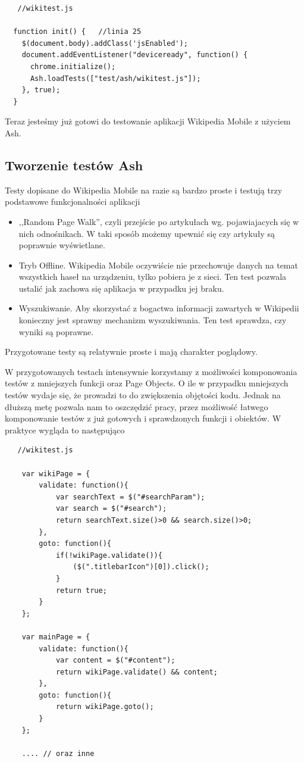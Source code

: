 \documentclass[brudnopis]{xmgr}
\begin{document}
\begin{lstlisting}
   //wikitest.js

  function init() {   //linia 25
    $(document.body).addClass('jsEnabled');
    document.addEventListener("deviceready", function() {
      chrome.initialize(); 
      Ash.loadTests(["test/ash/wikitest.js"]);
    }, true);
  }
\end{lstlisting}

Teraz jesteśmy już gotowi do testowanie aplikacji Wikipedia Mobile z użyciem Ash.

\subsection{Tworzenie testów Ash}

Testy dopisane do Wikipedia Mobile na razie są bardzo proste i testują trzy podstawowe funkcjonalności aplikacji 

\begin{itemize}
  \item ,,Random Page Walk'', czyli przejście po artykułach wg. pojawiajacych się w nich odnośnikach. W taki sposób możemy upewnić się czy artykuły są poprawnie wyświetlane.
  \item Tryb Offline. Wikipedia Mobile oczywiście nie przechowuje danych na temat wszystkich haseł na urządzeniu, tylko pobiera je z sieci. Ten test pozwala ustalić jak zachowa się aplikacja w przypadku jej braku.
  \item Wyszukiwanie. Aby skorzystać z bogactwa informacji zawartych w Wikipedii konieczny jest sprawny mechanizm wyszukiwania. Ten test sprawdza, czy wyniki są poprawne.  
\end{itemize}

Przygotowane testy są relatywnie proste i mają charakter poglądowy. 

W przygotowanych testach intensywnie korzystamy z możliwości komponowania testów z mniejszych funkcji oraz Page Objects. O ile w przypadku mniejszych testów wydaje się, że prowadzi to do zwiększenia objętości kodu. Jednak na dłuższą metę pozwala nam to oszczędzić pracy, przez możliwość łatwego komponowanie testów z już gotowych i sprawdzonych funkcji i obiektów. W praktyce wygląda to następująco

\begin{lstlisting}
   //wikitest.js

    var wikiPage = {
        validate: function(){
            var searchText = $("#searchParam");
            var search = $("#search");
            return searchText.size()>0 && search.size()>0;
        },
        goto: function(){
            if(!wikiPage.validate()){
                ($(".titlebarIcon")[0]).click();
            }
            return true;
        }
    };
    
    var mainPage = {
        validate: function(){
            var content = $("#content");
            return wikiPage.validate() && content;
        },
        goto: function(){
            return wikiPage.goto();
        }
    };

    .... // oraz inne
\end{lstlisting}
\end{document}

